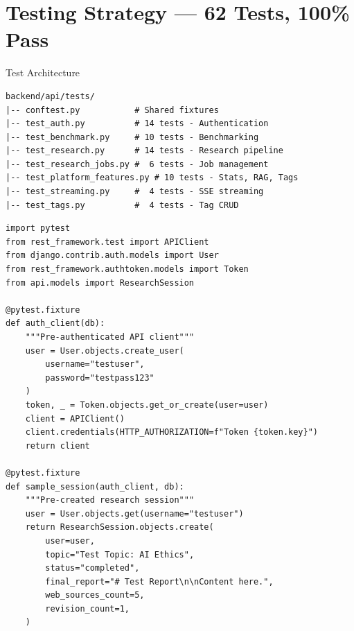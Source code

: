\documentclass[11pt,a4paper,twoside]{report}
\begin{document}

\chapter{Testing Strategy --- 62 Tests, 100\% Pass}

\begin{conceptbox}{Test Architecture}
\begin{lstlisting}[language={}]
backend/api/tests/
|-- conftest.py           # Shared fixtures
|-- test_auth.py          # 14 tests - Authentication
|-- test_benchmark.py     # 10 tests - Benchmarking
|-- test_research.py      # 14 tests - Research pipeline
|-- test_research_jobs.py #  6 tests - Job management
|-- test_platform_features.py # 10 tests - Stats, RAG, Tags
|-- test_streaming.py     #  4 tests - SSE streaming
|-- test_tags.py          #  4 tests - Tag CRUD
\end{lstlisting}
\end{conceptbox}

\begin{lstlisting}[style=pythonstyle,caption={conftest.py --- Test Fixtures}]
import pytest
from rest_framework.test import APIClient
from django.contrib.auth.models import User
from rest_framework.authtoken.models import Token
from api.models import ResearchSession

@pytest.fixture
def auth_client(db):
    """Pre-authenticated API client"""
    user = User.objects.create_user(
        username="testuser",
        password="testpass123"
    )
    token, _ = Token.objects.get_or_create(user=user)
    client = APIClient()
    client.credentials(HTTP_AUTHORIZATION=f"Token {token.key}")
    return client

@pytest.fixture
def sample_session(auth_client, db):
    """Pre-created research session"""
    user = User.objects.get(username="testuser")
    return ResearchSession.objects.create(
        user=user,
        topic="Test Topic: AI Ethics",
        status="completed",
        final_report="# Test Report\n\nContent here.",
        web_sources_count=5,
        revision_count=1,
    )
\end{lstlisting}
\end{document}
